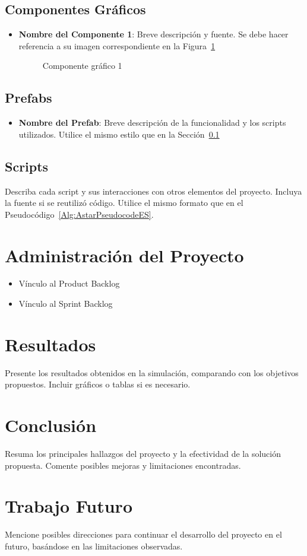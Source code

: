 \documentclass[sjournal]{IEEEtran}
\begin{document}
\subsection{Componentes Gráficos}\label{Sec:CompGraf}
\begin{itemize}
    \item \textbf{Nombre del Componente 1}: Breve descripción y fuente. Se debe hacer referencia a su imagen correspondiente en la Figura~\ref{Fi:componente1}
    \begin{figure}[!ht]\centering
	\caption{Componente gráfico 1}\label{Fi:componente1}
    \end{figure}
\end{itemize}

\subsection{Prefabs}
\begin{itemize}
    \item \textbf{Nombre del Prefab}: Breve descripción de la funcionalidad y los scripts utilizados. Utilice el mismo estilo que en la Sección~\ref{Sec:CompGraf}
\end{itemize}

\subsection{Scripts}
Describa cada script y sus interacciones con otros elementos del proyecto. Incluya la fuente si se reutilizó código. Utilice el mismo formato que en el Pseudocódigo~\ref{Alg:AstarPseudocodeES}.

\section{Administración del Proyecto}
\begin{itemize}
    \item Vínculo al Product Backlog
    \item Vínculo al Sprint Backlog
\end{itemize}

\section{Resultados}
Presente los resultados obtenidos en la simulación, comparando con los objetivos propuestos. Incluir gráficos o tablas si es necesario.

\section{Conclusión}
Resuma los principales hallazgos del proyecto y la efectividad de la solución propuesta. Comente posibles mejoras y limitaciones encontradas.

\section{Trabajo Futuro}
Mencione posibles direcciones para continuar el desarrollo del proyecto en el futuro, basándose en las limitaciones observadas.




\end{document}

